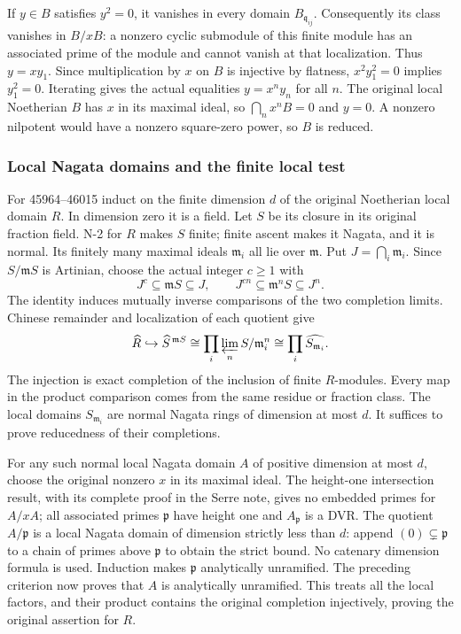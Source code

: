 If \(y\in B\) satisfies \(y^2=0\), it vanishes in every domain \(B_{\mathfrak q_{ij}}\). Consequently its class vanishes in \(B/xB\): a nonzero cyclic submodule of this finite module has an associated prime of the module and cannot vanish at that localization. Thus \(y=xy_1\). Since multiplication by \(x\) on \(B\) is injective by flatness, \(x^2y_1^2=0\) implies \(y_1^2=0\). Iterating gives the actual equalities \(y=x^n y_n\) for all \(n\). The original local Noetherian \(B\) has \(x\) in its maximal ideal, so \(\bigcap_n x^nB=0\) and \(y=0\). A nonzero nilpotent would have a nonzero square-zero power, so \(B\) is reduced.

\subsubsection{Local Nagata domains and the finite local test}\label{algebra-proof-067-local-nagata-domains-and-the-finite-local-test}

For 45964--46015 induct on the finite dimension \(d\) of the original Noetherian local domain \(R\). In dimension zero it is a field. Let \(S\) be its closure in its original fraction field. N-2 for \(R\) makes \(S\) finite; finite ascent makes it Nagata, and it is normal. Its finitely many maximal ideals \(\mathfrak m_i\) all lie over \(\mathfrak m\). Put \(J=\bigcap_i\mathfrak m_i\). Since \(S/\mathfrak mS\) is Artinian, choose the actual integer \(c\geq1\) with \[
 J^c\subseteq\mathfrak mS\subseteq J,
 \qquad J^{cn}\subseteq\mathfrak m^nS\subseteq J^n.
\] The identity induces mutually inverse comparisons of the two completion limits. Chinese remainder and localization of each quotient give \[
 \widehat R\hookrightarrow\widehat S^{\,\mathfrak mS}
 \cong\prod_i\varprojlim_n S/\mathfrak m_i^n
 \cong\prod_i\widehat{S_{\mathfrak m_i}}.
\] The injection is exact completion of the inclusion of finite \(R\)-modules. Every map in the product comparison comes from the same residue or fraction class. The local domains \(S_{\mathfrak m_i}\) are normal Nagata rings of dimension at most \(d\). It suffices to prove reducedness of their completions.

For any such normal local Nagata domain \(A\) of positive dimension at most \(d\), choose the original nonzero \(x\) in its maximal ideal. The height-one intersection result, with its complete proof in the Serre note, gives no embedded primes for \(A/xA\); all associated primes \(\mathfrak p\) have height one and \(A_{\mathfrak p}\) is a DVR. The quotient \(A/\mathfrak p\) is a local Nagata domain of dimension strictly less than \(d\): append \((0)\subsetneq\mathfrak p\) to a chain of primes above \(\mathfrak p\) to obtain the strict bound. No catenary dimension formula is used. Induction makes \(\mathfrak p\) analytically unramified. The preceding criterion now proves that \(A\) is analytically unramified. This treats all the local factors, and their product contains the original completion injectively, proving the original assertion for \(R\).


